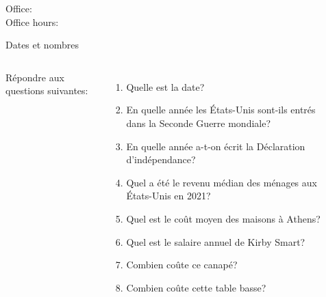 \documentclass{beamer}
\subtitle[Meubles et objets indirects]{Décrivant les meubles et les grands nombres}
\begin{document}
  \begin{frame}
    \titlepage
    \tiny{Office: \\
          Office hours: }
  \end{frame}

  \begin{frame}{Dates et nombres}
    \begin{columns}
      \scriptsize
        Répondre aux questions suivantes:
        \begin{enumerate}
          \item Quelle est la date? \underline{}
          \item<3-> En quelle année les États-Unis sont-ils entrés dans la Seconde Guerre mondiale? \underline{}
          \item<5-> En quelle année a-t-on écrit la Déclaration d'indépendance? \underline{}
          \item<7-> Quel a été le revenu médian des ménages  aux États-Unis en 2021? \underline{}
          \item<9-> Quel est le coût moyen  des maisons à Athens? \underline{}
          \item<11-> Quel est le salaire annuel de Kirby Smart? \underline{}
          \item<13-> Combien coûte ce canapé? \underline{}
          \item<15-> Combien coûte cette table basse? \underline{}
        \end{enumerate}
        \begin{minipage}[t][0.6\textheight]{\linewidth}
          \begin{center}
          \end{center}
        \end{minipage}
    \end{columns}
  \end{frame}
\end{document}
